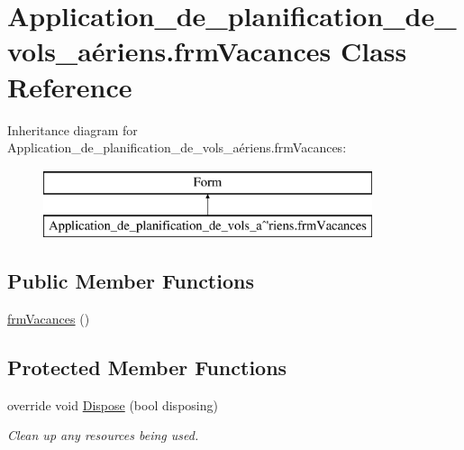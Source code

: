 \hypertarget{class_application__de__planification__de__vols__a_xC3_xA9riens_1_1frm_vacances}{}\section{Application\+\_\+de\+\_\+planification\+\_\+de\+\_\+vols\+\_\+aériens.\+frm\+Vacances Class Reference}
\label{class_application__de__planification__de__vols__a_xC3_xA9riens_1_1frm_vacances}
Inheritance diagram for Application\+\_\+de\+\_\+planification\+\_\+de\+\_\+vols\+\_\+aériens.\+frm\+Vacances\+:\begin{figure}[H]
\begin{center}
\leavevmode
\includegraphics[height=2.000000cm]{class_application__de__planification__de__vols__a_xC3_xA9riens_1_1frm_vacances}
\end{center}
\end{figure}
\subsection*{Public Member Functions}
\begin{DoxyCompactItemize}
\item 
\hyperlink{class_application__de__planification__de__vols__a_xC3_xA9riens_1_1frm_vacances_af6ec175b735c98e670f562feb41dc256}{frm\+Vacances} ()
\end{DoxyCompactItemize}
\subsection*{Protected Member Functions}
\begin{DoxyCompactItemize}
\item 
override void \hyperlink{class_application__de__planification__de__vols__a_xC3_xA9riens_1_1frm_vacances_a618e271102d37f12ad7dad5d252e2492}{Dispose} (bool disposing)
\begin{DoxyCompactList}\small\item\em Clean up any resources being used. \end{DoxyCompactList}\end{DoxyCompactItemize}


